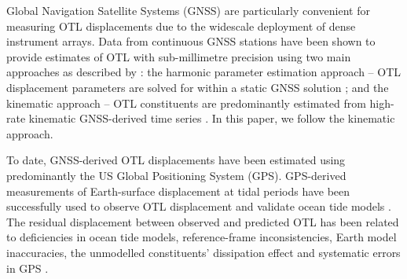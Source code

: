 \documentclass[se, manuscript]{copernicus}
\begin{document}
Global Navigation Satellite Systems (GNSS) are particularly convenient for measuring OTL displacements due to the widescale deployment of dense instrument arrays. Data from continuous GNSS stations have been shown to provide estimates of OTL with sub-millimetre precision using two main approaches as described by \cite{Penna2015}: the harmonic parameter estimation approach – OTL displacement parameters are solved for within a static GNSS solution \citep[e.g.,][]{Schenewerk2001,Allinson2004,King2005,Thomas2006,Yuan2012,Yuan2013}; and the kinematic approach – OTL constituents are predominantly estimated from high-rate kinematic GNSS-derived time series \citep[e.g.,][]{Khan2001,King2006,Penna2015,Martens2016,Wang2019}. In this paper, we follow the kinematic approach.

To date, GNSS-derived OTL displacements have been estimated using predominantly the US Global Positioning System (GPS). GPS-derived measurements of Earth-surface displacement at tidal periods have been successfully used to observe OTL displacement and validate ocean tide models \citep{Urschl2005,King2005}. The residual displacement between observed and predicted OTL has been related to deficiencies in ocean tide models, reference-frame inconsistencies, Earth model inaccuracies, the unmodelled constituents’ dissipation effect and systematic errors in GPS \citep[e.g.,][]{Thomas2006,Ito2011,Yuan2013,Bos2015}.
\end{document}
